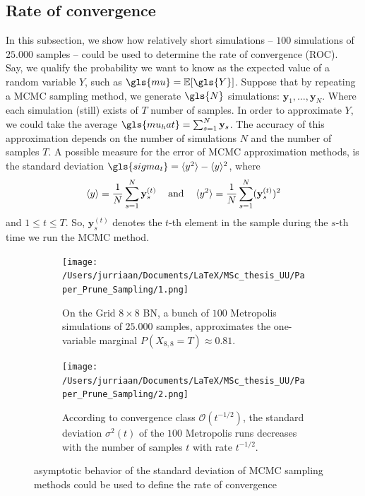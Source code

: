\documentclass[a4paper, twoside, 11pt]{report}
\theoremstyle{plain}
\theoremstyle{definition}
\theoremstyle{remark}
\newcommand{\E}{{\mathbb E}}
\newcommand{\bfy}{{\mathbf{y}}}
\begin{document}
\subsection{Rate of convergence}
In this subsection, we show how relatively short simulations -- $100$ simulations of $25.000$ samples -- could be used to determine the rate of convergence (ROC). \\

Say, we qualify the probability we want to know as the expected value of a random variable $Y$, such as $\gls{mu} = \E[\gls{Y}]$. Suppose that by repeating a MCMC sampling method, we generate $\gls{N}$ simulations: $\bfy_1, \ldots , \bfy_N$. Where each simulation (still) exists of $T$ number of samples. In order to approximate $Y$, we could take the average $\gls{mu_hat} = \sum_{s=1}^N \bfy_s$. The accuracy of this approximation depends on the number of simulations $N$ and the number of samples $T$. A possible measure for the error of MCMC approximation methods, is the standard deviation $\gls{sigma_t} = \langle y^2 \rangle - \langle y \rangle ^2$, where
\begin{align*}
\centering
\langle y \rangle = \frac{1}{N} \sum_{s=1}^N \bfy_s^{(t)} \hspace{1pc} \text{and} \hspace{1pc}  \langle y^2 \rangle = \frac{1}{N} \sum_{s=1}^N (\bfy_s^{(t)})^2
\end{align*}
and $1 \leq t \leq T$. So, $\bfy_s^{(t)}$ denotes the $t$-th element in the sample during the $s$-th time we run the MCMC method. 
\begin{figure}[H]
\centering
\begin{subfigure}[t]{0.5\textwidth}
  \centering
  \captionsetup{width = 0.9\textwidth}
  \texttt{[image: /Users/jurriaan/Documents/LaTeX/MSc\_thesis\_UU/Paper\_Prune\_Sampling/1.png]}
  \caption{On the Grid $8 \times 8$ BN, a bunch of $100$ Metropolis simulations of $25.000$ samples, approximates the one-variable marginal $P(X_{8,8} = T) \approx 0.81$.}
  \label{sub_1a}
\end{subfigure}%
\begin{subfigure}[t]{0.5\textwidth}
  \centering
  \captionsetup{width = 0.9\textwidth}
  \texttt{[image: /Users/jurriaan/Documents/LaTeX/MSc\_thesis\_UU/Paper\_Prune\_Sampling/2.png]}
  \caption{According to convergence class $\mathcal{O}(t^{-1/2})$, the standard deviation ${\sigma}^2(t)$ of the $100$ Metropolis runs decreases with the number of samples $t$ with rate $t^{-1/2}$.}
  \label{sub_1b}
\end{subfigure}
\caption{asymptotic behavior of the standard deviation of MCMC sampling methods could be used to define the rate of convergence}
\label{fig1}
\end{figure}
\end{document}
